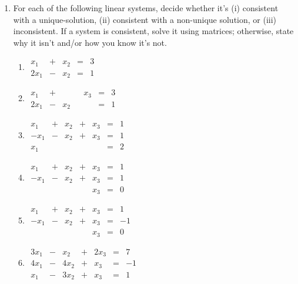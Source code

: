 \documentclass[12 pt]{article}
\begin{document}
\begin{enumerate}[leftmargin=0in, rightmargin=-0.25in]
	\item For each of the following linear systems, decide whether it's (i) consistent with a unique-solution, (ii) consistent with a non-unique solution, or (iii) inconsistent. If a system is consistent, solve it using matrices; otherwise, state why it isn't and/or how you know it's not.
	\begin{adjustwidth}{0in}{-0.375in}
		\begin{multicols}{3}
			\begin{enumerate}[itemsep=0.75in,leftmargin=0in,rightmargin=0in]
				\item $\begin{array}{ccccc}x_1 & + & x_2 & = & 3 \\ 2x_1 & - & x_2 & = & 1\end{array}$
				\item $\begin{array}{ccccccc}x_1 & + & & & x_3 & = & 3 \\ 2x_1 & - & x_2 & & & = & 1\end{array}$
				\item $\begin{array}{ccccccc}x_1 & + & x_2 & + & x_3 & = & 1 \\ -x_1 & - & x_2 & + & x_3 & = & 1 \\ x_1 & & & &  & = & 2\end{array}$
				\item $\begin{array}{ccccccc}x_1 & + & x_2 & + & x_3 & = & 1 \\ -x_1 & - & x_2 & + & x_3 & = & 1 \\ & & & &  x_3 & = & 0\end{array}$
				\item $\begin{array}{ccccccc}x_1 & + & x_2 & + & x_3 & = & 1 \\ -x_1 & - & x_2 & + & x_3 & = & -1 \\ & & & &  x_3 & = & 0\end{array}$
				\item $\begin{array}{ccccccc}3x_1 & - & x_2 & + & 2x_3 & = & 7 \\ 4x_1 & - & 4x_2 & + & x_3 & = & -1 \\ x_1 & - & 3x_2 & + & x_3 & = & 1\end{array}$
			\end{enumerate}
		\end{multicols}
	\end{adjustwidth}


\end{enumerate}
\end{document}

